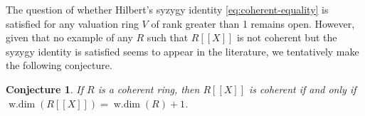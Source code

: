 \documentclass[12pt]{amsart}
\newtheorem{conjecture}[theorem]{Conjecture}
\theoremstyle{plain}
\newcommand{\wdim}{\operatorname{w.dim}}
\begin{document}

\noindent The question of whether Hilbert's syzygy identity \eqref{eq:coherent-equality} is satisfied for any valuation ring $V$ of rank greater than 1 remains open. However, given that no example of any $R$ such that $R[[X]]$ is not coherent but the syzygy identity is satisfied seems to appear in the literature, we tentatively make the following conjecture.

\begin{conjecture}
If $R$ is a coherent ring, then $R[[X]]$ is coherent if and only if $\wdim(R[[X]])=\wdim(R)+1$.
\end{conjecture}
\end{document}
